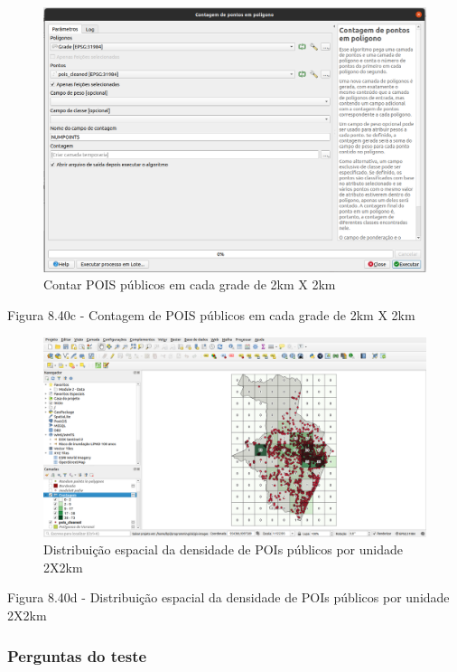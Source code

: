 \documentclass[
  portuguese,
]{krantz}
\begin{document}
\begin{figure}
\centering
\includegraphics{media/modulo8/fig840_c.png}
\caption{Contar POIS públicos em cada grade de 2km X 2km}
\end{figure}

Figura 8.40c - Contagem de POIS públicos em cada grade de 2km X 2km

\begin{figure}
\centering
\includegraphics{media/modulo8/fig840_d.png}
\caption{Distribuição espacial da densidade de POIs públicos por unidade 2X2km}
\end{figure}

Figura 8.40d - Distribuição espacial da densidade de POIs públicos por unidade 2X2km

\hypertarget{perguntas-do-teste-1}{%
\subsubsection{\texorpdfstring{\textbf{Perguntas do teste}}{Perguntas do teste}}\label{perguntas-do-teste-1}}
\end{document}
